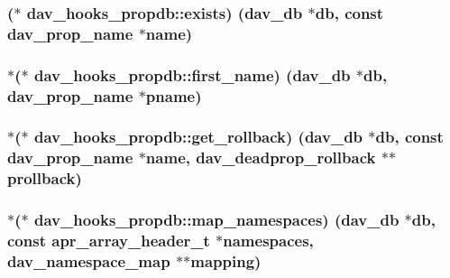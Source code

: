 \subsubsection[{\texorpdfstring{exists}{exists}}]{($\ast$ dav\+\_\+hooks\+\_\+propdb\+::exists) ({\bf dav\+\_\+db} $\ast$db, const {\bf dav\+\_\+prop\+\_\+name} $\ast${\bf name})}\hypertarget{structdav__hooks__propdb_aa6a47cffee52f86169116696a3dba585}{}\label{structdav__hooks__propdb_aa6a47cffee52f86169116696a3dba585}
\subsubsection[{\texorpdfstring{first\+\_\+name}{first_name}}]{$\ast$($\ast$ dav\+\_\+hooks\+\_\+propdb\+::first\+\_\+name) ({\bf dav\+\_\+db} $\ast$db, {\bf dav\+\_\+prop\+\_\+name} $\ast$pname)}\hypertarget{structdav__hooks__propdb_ae5f74e4694737191489f1b2d77bc91ba}{}\label{structdav__hooks__propdb_ae5f74e4694737191489f1b2d77bc91ba}
\subsubsection[{\texorpdfstring{get\+\_\+rollback}{get_rollback}}]{$\ast$($\ast$ dav\+\_\+hooks\+\_\+propdb\+::get\+\_\+rollback) ({\bf dav\+\_\+db} $\ast$db, const {\bf dav\+\_\+prop\+\_\+name} $\ast${\bf name}, {\bf dav\+\_\+deadprop\+\_\+rollback} $\ast$$\ast$prollback)}\hypertarget{structdav__hooks__propdb_a1e7ad8858b88f717b7ed7e04e47f9c5d}{}\label{structdav__hooks__propdb_a1e7ad8858b88f717b7ed7e04e47f9c5d}
\subsubsection[{\texorpdfstring{map\+\_\+namespaces}{map_namespaces}}]{$\ast$($\ast$ dav\+\_\+hooks\+\_\+propdb\+::map\+\_\+namespaces) ({\bf dav\+\_\+db} $\ast$db, const {\bf apr\+\_\+array\+\_\+header\+\_\+t} $\ast${\bf namespaces}, {\bf dav\+\_\+namespace\+\_\+map} $\ast$$\ast$mapping)}\hypertarget{structdav__hooks__propdb_a3501ba9aa616ed5883eb0e7689b50af3}{}\label{structdav__hooks__propdb_a3501ba9aa616ed5883eb0e7689b50af3}
